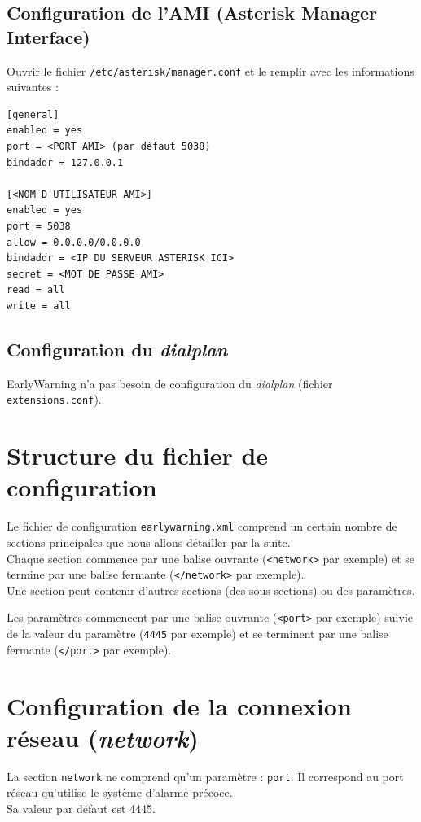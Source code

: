 \documentclass{article}
\begin{document}
\subsection{Configuration de l'AMI (Asterisk Manager Interface)}

Ouvrir le fichier \texttt{/etc/asterisk/manager.conf} et le remplir avec les informations suivantes :

\begin{verbatim}
[general]
enabled = yes
port = <PORT AMI> (par défaut 5038)
bindaddr = 127.0.0.1

[<NOM D'UTILISATEUR AMI>]
enabled = yes
port = 5038
allow = 0.0.0.0/0.0.0.0
bindaddr = <IP DU SERVEUR ASTERISK ICI>
secret = <MOT DE PASSE AMI>
read = all
write = all
\end{verbatim}

\subsection{Configuration du \emph{dialplan}}

EarlyWarning n'a pas besoin de configuration du \emph{dialplan} (fichier \texttt{extensions.conf}).

\pagebreak
\section{Structure du fichier de configuration}

Le fichier de configuration \texttt{earlywarning.xml} comprend un certain nombre de sections principales que nous allons détailler par la suite. \\
Chaque section commence par une balise ouvrante (\texttt{<network>} par exemple) et se termine par une balise fermante (\texttt{</network>} par exemple). \\
Une section peut contenir d'autres sections (des sous-sections) ou des paramètres.

Les paramètres commencent par une balise ouvrante (\texttt{<port>} par exemple) suivie de la valeur du paramètre (\texttt{4445} par exemple) et se terminent par une balise fermante (\texttt{</port>} par exemple).

\section{Configuration de la connexion réseau (\emph{network})}

La section \texttt{network} ne comprend qu'un paramètre : \texttt{port}. Il correspond au port réseau qu'utilise le système d'alarme précoce. \\
Sa valeur par défaut est 4445.
\end{document}

